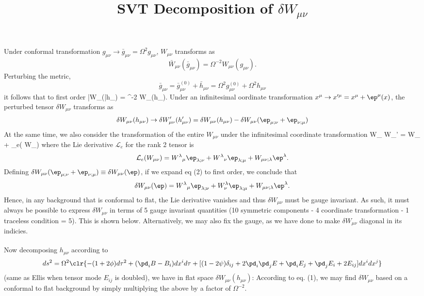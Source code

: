 \documentclass[10pt,letterpaper]{article}
\title{SVT Decomposition of $\delta W_{\mu\nu}$}
\author{}
\date{}
\begin{document}
\maketitle
Under conformal transformation $g_{\mu\nu} \to \bar{g}_{\mu\nu} = \Omega^2 g_{\mu\nu}$, $W_{\mu\nu}$ transforms as
\[
	\bar W_{\mu\nu}(\bar g_{\mu\nu}) =  \Omega^{-2}W_{\mu\nu}(g_{\mu\nu}).
\]
Perturbing the metric, 
\[
	\bar g_{\mu\nu} = \bar g^{(0)}_{\mu\nu} + \bar h_{\mu\nu} = \Omega^2 g^{(0)}_{\mu\nu} + \Omega^2 h_{\mu\nu}
\]
it follows that to first order
\be
	\delta \bar W_{\mu\nu}(\bar h_{\mu\nu}) = \Omega^{-2} \delta W_{\mu\nu}(h_{\mu\nu}).
\ee
Under an infinitesimal oordinate transformation $x^\mu \to x'^\mu = x^\mu + \ep^\mu(x)$, the perturbed tensor $\delta W_{\mu\nu}$ transforms as
\[
	\delta W_{\mu\nu}(h_{\mu\nu}) \to \delta W'_{\mu\nu}(h'_{\mu\nu}) = \delta W_{\mu\nu}(h_{\mu\nu}) - \delta W_{\mu\nu}(\ep_{\mu;\nu}+\ep_{\nu;\mu})
\]
At the same time, we also consider the transformation of the entire $W_{\mu\nu}$ under the infinitesimal coordinate transformation
\be
	W_{\mu\nu} \to W_{\mu\nu}' = W_{\mu\nu} + _e( W_{\mu\nu})
\ee
where the Lie derivative $\mathcal L_e$ for the rank 2 tensor is
\[
	 \mathcal{L}_e( W_{\mu\nu}) = W^{\lambda}{}_\mu \ep_{\lambda;\nu} + W^{\lambda}{}_\nu \ep_{\lambda;\mu} + W_{\mu\nu;\lambda}\ep^\lambda.
\]
Defining $\delta W_{\mu\nu}(\ep_{\mu;\nu}+\ep_{\nu;\mu}) \equiv \delta W_{\mu\nu}(\ep)$, if we expand eq (2) to first order, we conclude that
\[
	 \delta W_{\mu\nu}(\ep) =  W^{\lambda}{}_\mu \ep_{\lambda;\nu} + W^{\lambda}_\nu \ep_{\lambda;\mu} + W_{\mu\nu;\lambda}\ep^\lambda.
\]
Hence, in any background that is conformal to flat, the Lie derivative vanishes and thus $\delta W_{\mu\nu}$ must be gauge invariant. As such, it must always be possible to express $\delta W_{\mu\nu}$ in terms of 5 gauge invariant quantities (10 symmetric components - 4 coordinate transformation - 1 traceless condition = 5). This is shown below. Alternatively, we may also fix the gauge, as we have done to make $\delta W_{\mu\nu}$ diagonal in its indicies. 
\\ \\
Now decomposing $h_{\mu\nu}$ according to 
\[
	ds^2 = \Omega^2\clr{ -(1+2\phi)d\tau^2 + (\pd_i B-B_i)dx^id\tau + [(1-2\psi)\delta_{ij}+2\pd_i\pd_j E + \pd_i E_j+\pd_j E_i + 2E_{ij}]dx^i dx^j}
\]
(same as Ellis when tensor mode $E_{ij}$ is doubled), we have in flat space $\delta W_{\mu\nu}(h_{\mu\nu})$:
\noindent According to eq. (1), we may find $\delta W_{\mu\nu}$ based on a conformal to flat background by simply multiplying the above by a factor of $\Omega^{-2}$. 
\end{document}

